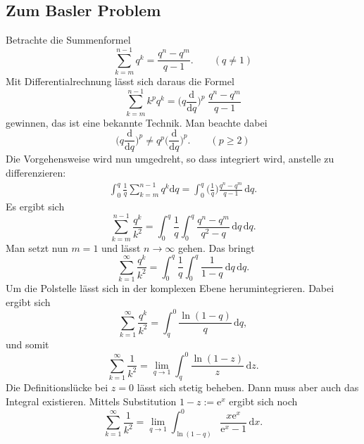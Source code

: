 \documentclass[a4paper,10pt,fleqn,twocolumn,twoside]{scrartcl}
\numberwithin{equation}{section}
\newcommand{\ee}{\mathrm e}
\theoremstyle{rmbox}
\begin{document}
\subsection{Zum Basler Problem}
Betrachte die Summenformel
\begin{equation}
\sum_{k=m}^{n-1} q^k = \frac{q^n-q^m}{q-1}.\qquad (q\ne 1)
\end{equation}
Mit Differentialrechnung lässt sich daraus die Formel
\begin{equation}
\sum_{k=m}^{n-1} k^p q^k 
= \Big(q\frac{\mathrm d}{\mathrm dq}\Big)^p\;\frac{q^n-q^m}{q-1}
\end{equation}
gewinnen, das ist eine bekannte Technik. Man beachte dabei
\begin{equation}
\Big(q\frac{\mathrm d}{\mathrm dq}\Big)^p
\ne q^p \Big(\frac{\mathrm d}{\mathrm dq}\Big)^p.\qquad (p\ge 2)
\end{equation}
Die Vorgehensweise wird nun umgedreht, so dass integriert wird,
anstelle zu differenzieren:
\begin{gather}
\int_0^q \frac{1}{q}\sum_{k=m}^{n-1} q^k \mathrm dq
= \int_0^q\bigg(\frac{1}{q}\bigg)\frac{q^n-q^m}{q-1}\,\mathrm dq.
\end{gather}
Es ergibt sich
\begin{equation}
\sum_{k=m}^{n-1}\frac{q^k}{k^2}
= \int_0^q\frac{1}{q}\int_0^q\frac{q^n-q^m}{q^2-q}\,\mathrm dq\,\mathrm dq.
\end{equation}
Man setzt nun $m=1$ und lässt $n\to\infty$ gehen.
Das bringt%
\begin{equation}
\sum_{k=1}^\infty\frac{q^k}{k^2}
= \int_0^q\frac{1}{q}\int_0^q\frac{1}{1-q}\,\mathrm dq\,\mathrm dq.
\end{equation}
Um die Polstelle lässt sich in der komplexen Ebene herumintegrieren.
Dabei ergibt sich%
\begin{equation}
\sum_{k=1}^\infty\frac{q^k}{k^2}
= \int_q^0 \frac{\ln(1-q)}{q}\,\mathrm dq,
\end{equation}
und somit
\begin{equation}
\sum_{k=1}^\infty\frac{1}{k^2}
= \lim_{q\to 1}\int_q^0 \frac{\ln(1-z)}{z}\,\mathrm dz.
\end{equation}
Die Definitionslücke bei $z=0$ lässt sich stetig beheben. Dann muss
aber auch das Integral existieren. Mittels Substitution $1-z:=\ee^x$
ergibt sich noch
\begin{equation}
\sum_{k=1}^\infty\frac{1}{k^2}
= \lim_{q\to 1}\int_{\ln(1-q)}^0 \frac{x\ee^x}{\ee^x-1}\,\mathrm dx.
\end{equation}
\end{document}
